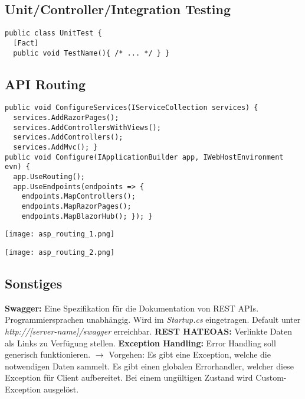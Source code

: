 \subsection{Unit/Controller/Integration Testing}
\begin{lstlisting}[style=csh]
public class UnitTest {
  [Fact]
  public void TestName(){ /* ... */ } }
\end{lstlisting}
\subsection{API Routing}
\begin{lstlisting}[style=csh]
public void ConfigureServices(IServiceCollection services) {
  services.AddRazorPages();
  services.AddControllersWithViews();
  services.AddControllers();
  services.AddMvc(); }
public void Configure(IApplicationBuilder app, IWebHostEnvironment evn) {
  app.UseRouting();
  app.UseEndpoints(endpoints => {
    endpoints.MapControllers();
    endpoints.MapRazorPages();
    endpoints.MapBlazorHub(); }); }
\end{lstlisting}
\begin{minipage}{0.5\linewidth}
  \texttt{[image: asp\_routing\_1.png]}
\end{minipage}
\begin{minipage}{0.5\linewidth}
  \texttt{[image: asp\_routing\_2.png]}
\end{minipage}
\subsection{Sonstiges}
\textcolor{b}{\textbf{Swagger:}} Eine Spezifikation für die Dokumentation von REST APIs. Programmiersprachen unabhängig. Wird im \textit{Startup.cs} eingetragen. Default unter \textit{http://[server-name]/swagger} erreichbar. \textcolor{b}{\textbf{REST HATEOAS:}} Verlinkte Daten als Links zu Verfügung stellen. \textcolor{b}{\textbf{Exception Handling:}} Error Handling soll generisch funktionieren. $\rightarrow$ Vorgehen: Es gibt eine Exception, welche die notwendigen Daten sammelt. Es gibt einen globalen Errorhandler, welcher diese Exception für Client aufbereitet. Bei einem ungültigen Zustand wird Custom-Exception ausgelöst.
